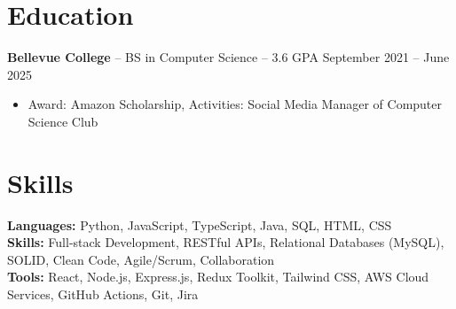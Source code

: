 \documentclass[11pt]{article}       %
\begin{document}

\vspace{-18.5pt}

\section*{Education}
\textbf{Bellevue College} -- BS in Computer Science -- 3.6 GPA \hfill September 2021 -- June 2025\\
\vspace{-9pt}
\begin{itemize}
  \item Award: Amazon Scholarship, Activities: Social Media Manager of Computer Science Club
\end{itemize}

\vspace{-18.5pt}

\section*{Skills}
\textbf{Languages:} Python, JavaScript, TypeScript, Java, SQL, HTML, CSS\\
\textbf{Skills:} Full-stack Development, RESTful APIs, Relational Databases (MySQL), SOLID, Clean Code, Agile/Scrum, Collaboration\\
\textbf{Tools:} React, Node.js, Express.js, Redux Toolkit, Tailwind CSS, AWS Cloud Services, GitHub Actions, Git, Jira

\vspace{-6.5pt}
\end{document}
